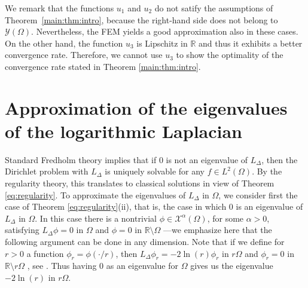 \documentclass[10 pt]{article}
\numberwithin{equation}{section}
\def\R{\mathbb{R}}
\newcommand{\SJ}[1]{{\color{ForestGreen} #1}}  %
\begin{document}
We remark that the functions $u_1$ and $u_2$ do not satify the assumptions of Theorem~\ref{main:thm:intro}, because the right-hand side does not belong to $\mathcal Y(\Omega)$. Nevertheless, the FEM yields a good approximation also in these cases.  On the other hand, the function $u_3$ is Lipschitz in $\R$ and thus it exhibits a better convergence rate. Therefore, we cannot use $u_3$ to show the optimality of the convergence rate stated in Theorem \ref{main:thm:intro}.


\section{Approximation of the eigenvalues of the logarithmic Laplacian}\label{eigenvalue approximation}

Standard Fredholm theory implies that if $0$ is not an eigenvalue of $L_\Delta$, then the Dirichlet problem with $L_{\Delta}$ is uniquely solvable for any $f\in L^2(\Omega)$. By the regularity theory, this translates to classical solutions in view of  Theorem \ref{eq:regularity}. To approximate the eigenvalues of $L_{\Delta}$ in $\Omega$, we consider first the case of Theorem \ref{eq:regularity}(ii), that is, the case in which $0$ is an eigenvalue of $L_{\Delta}$ in $\Omega$. In this case there is a nontrivial $\phi\in \mathcal X^{\alpha}(\Omega)$, for some $\alpha>0$, satisfying $L_{\Delta}\phi=0$ in  $\Omega$ and $\phi=0$ in $\R\setminus \Omega$ ---we emphasize here that the following argument can be done in any dimension. Note that if we define for $r>0$ a function $\phi_r=\phi(\cdot/r)$, then $L_{\Delta}\phi_r=-2\ln(r)\phi_r$ in $r\Omega$ and $\phi_r=0$ in $\R\setminus r\Omega$\SJ{, see \cite[Lemma 2.5]{LW21}}. Thus having $0$ as an eigenvalue for $\Omega$ gives us the eigenvalue $-2\ln(r)$ in $r\Omega$.\\
\end{document}
